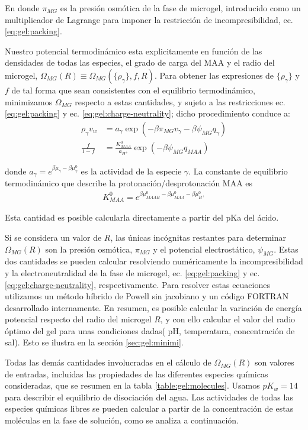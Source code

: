 \noindent En donde $\pi_{MG}$ es la presi\'on osm\'otica de la fase de microgel, introducido como un multiplicador de Lagrange para imponer la restricci\'on de incompresibilidad, ec. \ref{eq:gel:packing}.


Nuestro potencial termodin\'amico esta explicitamente en funci\'on de las densidades de todas las especies, el grado de carga del MAA y el radio del microgel, $\Omega_{MG}(R)\equiv\Omega_{MG}(\{\rho_\gamma\},f,R)$.
Para obtener las expresiones de $\{\rho_\gamma\}$ y $f$ de tal forma que sean consistentes con el equilibrio termodin\'amico, minimizamos $\Omega_{MG}$ respecto a estas cantidades, y  sujeto a las restricciones ec. \ref{eq:gel:packing} y ec. \ref{eq:gel:charge-neutrality}; dicho procedimiento conduce a: 
%
%
\begin{align}
\rho_\gamma v_w &= a_\gamma \exp(-\beta\pi_{MG}v_\gamma -\beta\psi_{MG}q_{\gamma})\\
\frac{f}{1-f}&= \frac{K^0_{MAA}}{a_{H^+}}\exp(-\beta\psi_{MG}q_{MAA})\label{eq:gel:fcharge}
\end{align}

\noindent donde $a_\gamma = e^{\beta\mu_\gamma-\beta\mu_\gamma^0}$ es la actividad de la especie $\gamma$. 
La constante de equilibrio termodin\'amico que describe la protonaci\'on/desprotonaci\'on MAA es
%
%
\begin{align}
K^0_{MAA}= e^{\beta\mu^0_{MAAH}-\beta\mu^0_{MAA}-\beta\mu^0_{H^+}}
\end{align}

\noindent Esta cantidad es posible calcularla directamente a partir del pKa del \'acido.


Si se considera  un valor de  $R$, las \'unicas inc\'ognitas restantes para determinar $\Omega_{MG}(R)$ son la presi\'on osm\'otica, $\pi_{MG}$ y el potencial electrost\'atico, $\psi_{MG}$.
Estas dos cantidades se pueden calcular resolviendo num\'ericamente la incompresibilidad y la electroneutralidad de la fase de microgel, ec. \ref{eq:gel:packing} y ec. \ref{eq:gel:charge-neutrality}, respectivamente.
Para resolver estas ecuaciones utilizamos un m\'etodo h\'ibrido de Powell sin jacobiano y un c\'odigo FORTRAN desarrollado internamente.
En resumen, es posible calcular la variaci\'on de energ\'ia potencial respecto del radio del microgel $R$, y con ello calcular el valor del radio \'optimo del gel para unas condiciones dadas( pH, temperatura, concentraci\'on de sal). Esto se ilustra en la secci\'on \ref{sec:gel:minimi}.

Todas las dem\'as cantidades involucradas en el c\'alculo de $\Omega_{MG}(R)$ son valores de  entradas, incluidas las propiedades de las diferentes especies qu\'imicas consideradas, que se resumen en la tabla \ref{table:gel:molecules}.
Usamos $pK_w=14$ para describir el equilibrio de disociaci\'on del agua.
Las actividades de todas las especies qu\'imicas libres se pueden calcular a partir de la concentraci\'on de estas mol\'eculas en la fase de soluci\'on, como se analiza a continuaci\'on.


